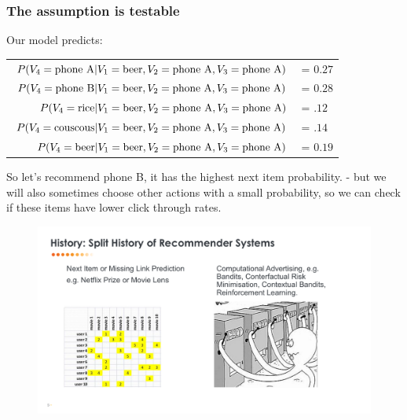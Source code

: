  \begin{frame}
  \frametitle{The assumption is testable}

Our model predicts:
  \begin{tabular}{r l}
    $P(V_4={\rm phone ~ A} |V_1 = {\rm beer}, V_2 = {\rm phone ~ A}, V_3 = {\rm phone ~ A} )$ &= $0.27$ \\
    $P(V_4={\rm phone ~ B} |V_1 = {\rm beer}, V_2 = {\rm phone ~ A}, V_3 = {\rm phone ~ A} )$ &= $0.28$ \\
    $P(V_4={\rm rice} |V_1 = {\rm beer}, V_2 = {\rm phone ~ A}, V_3 = {\rm phone ~ A} )$ &= $.12$ \\
    $P(V_4={\rm couscous} |V_1 = {\rm beer}, V_2 = {\rm phone ~ A}, V_3 = {\rm phone ~ A} )$ &= $.14$ \\
    $P(V_4={\rm beer} |V_1 = {\rm beer}, V_2 = {\rm phone ~ A}, V_3 = {\rm phone ~ A} )$ &= $0.19$ \\
  \end{tabular}

So let's recommend phone B, it has the highest next item
probability. \pause - but we will also sometimes choose other actions
with a small probability, so we can check if these items have lower
click through rates.



\end{frame}

 \begin{frame}
  
   \begin{figure}[h!]
     \includegraphics[scale=0.34]{images/octo.png}
       \centering
       \label{motex1}
   \end{figure}
   

 \end{frame}


